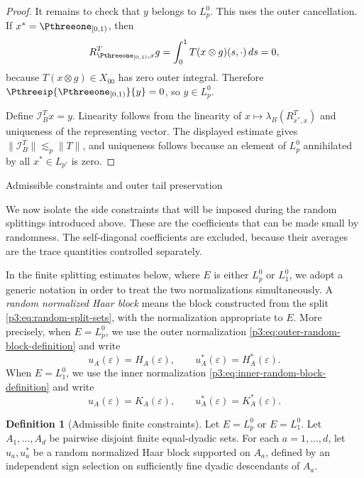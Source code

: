 \documentclass[11pt,reqno]{amsart}
\makeatletter
\theoremstyle{plain}
\theoremstyle{definition}
\newtheorem{definition}[definition]{Definition}
\newcounter{problempaper}
\newenvironment{problempaperbody}{%
  \setcounter{subsection}{0}%
  \setcounter{subsubsection}{0}%
  \setcounter{paragraph}{0}%
  \renewcommand{\thesubsection}{\arabic{subsection}}%
  \renewcommand{\thesubsubsection}{\thesubsection.\arabic{subsubsection}}%
  \renewcommand{\theparagraph}{\thesubsubsection.\arabic{paragraph}}%
  \let\problem@outersection\section
  \let\problem@outersubsection\subsection
  \let\problem@outersubsubsection\subsubsection
  \let\problem@outerparagraph\paragraph
  \let\section\problem@papersection
  \let\subsection\problem@papersubsection
  \let\subsubsection\problem@papersubsubsection
}{%
  \let\section\problem@outersection
  \let\subsection\problem@outersubsection
  \let\subsubsection\problem@outersubsubsection
  \let\paragraph\problem@outerparagraph
}
\newcommand{\problem@target}[2]{%
  \hypertarget{problem-\theproblempaper-#1-#2}{}%
}
\newcommand{\problem@paperheading}[3]{%
  \par\bigskip
  \problem@target{#1}{#2}%
  \noindent{\large\bfseries #2.\quad #3\par}%
  \nobreak\smallskip
}
\newcommand{\problem@papersubheading}[3]{%
  \par\medskip
  \problem@target{#1}{#2}%
  \noindent{\normalsize\bfseries #2.\quad #3\par}%
  \nobreak\smallskip
}
\newcommand{\problem@papersubsubheading}[3]{%
  \par\smallskip
  \problem@target{#1}{#2}%
  \noindent{\normalsize\itshape #2.\quad #3.\ }%
}
\def\problem@papersection{%
  \@ifstar{\problem@papersectionstar}{\problem@papersectionnostar}%
}
\def\problem@papersectionstar#1{%
  \par\bigskip\noindent{\large\bfseries #1\par}\nobreak\smallskip
}
\def\problem@papersectionnostar#1{%
  \refstepcounter{subsection}%
  \setcounter{subsubsection}{0}%
  \setcounter{paragraph}{0}%
  \problem@paperheading{section}{\thesubsection}{#1}%
  \problem@writecontentsline{section}{\thesubsection}{#1}%
}
\def\problem@papersubsection{%
  \@ifstar{\problem@papersubsectionstar}{\problem@papersubsectionnostar}%
}
\def\problem@papersubsectionstar#1{%
  \par\medskip\noindent{\normalsize\bfseries #1\par}\nobreak\smallskip
}
\def\problem@papersubsectionnostar#1{%
  \refstepcounter{subsubsection}%
  \setcounter{paragraph}{0}%
  \problem@papersubheading{subsection}{\thesubsubsection}{#1}%
  \problem@writecontentsline{subsection}{\thesubsubsection}{#1}%
}
\def\problem@papersubsubsection{%
  \@ifstar{\problem@papersubsubsectionstar}{\problem@papersubsubsectionnostar}%
}
\def\problem@papersubsubsectionstar#1{%
  \par\smallskip\noindent{\normalsize\itshape #1.\ }%
}
\def\problem@papersubsubsectionnostar#1{%
  \refstepcounter{paragraph}%
  \problem@papersubsubheading{subsubsection}{\theparagraph}{#1}%
  \problem@writecontentsline{subsubsection}{\theparagraph}{#1}%
}
\newcommand{\problem@writecontentsline}[3]{%
  \begingroup
  \protected@write\@auxout{}{%
    \string\problemcontentsentry{\theproblempaper}{#1}{#2}{#3}{\thepage}%
  }%
  \endgroup
}
\newcommand{\problemcontentsentry}[5]{%
  \@ifundefined{problemcontents@#1}{%
    \expandafter\gdef\csname problemcontents@#1\endcsname{}%
  }{}%
  \expandafter\g@addto@macro\csname problemcontents@#1\endcsname{%
    \problemcontentsline{#1}{#2}{#3}{#4}{#5}%
  }%
}
\newcommand{\problemcontentslink}[4]{%
  \hyperlink{problem-#1-#2-#3}{#4}%
}
\newcommand{\problemcontentsline}[5]{%
  \ifstrequal{#2}{section}{%
    \par\noindent
    \problemcontentslink{#1}{#2}{#3}{\makebox[2.5em][l]{#3}#4}%
    \nobreak\dotfill
    \problemcontentslink{#1}{#2}{#3}{#5}\par
  }{%
    \ifstrequal{#2}{subsection}{%
      \par\noindent\hspace*{1.5em}%
      \problemcontentslink{#1}{#2}{#3}{\makebox[3.5em][l]{#3}#4}%
      \nobreak\dotfill
      \problemcontentslink{#1}{#2}{#3}{#5}\par
    }{%
      \par\noindent\hspace*{3em}%
      \problemcontentslink{#1}{#2}{#3}{\makebox[4.5em][l]{#3}#4}%
      \nobreak\dotfill
      \problemcontentslink{#1}{#2}{#3}{#5}\par
    }%
  }%
}
\makeatother
\begin{document}
\begin{problempaperbody}
\begin{proof}
It remains to check that $y$ belongs to $L_p^0$. This uses the outer cancellation. If $x^*=\Pthreeone_{[0,1)}$, then
\begin{equation*}
        R_{\Pthreeone_{[0,1)},x}^Tg=\int_0^1T(x\otimes g)(s,\cdot)\,ds=0,
\end{equation*}
because $T(x\otimes g)\in X_{00}$ has zero outer integral. Therefore $\Pthreeip{\Pthreeone_{[0,1)}}{y}=0$, so $y\in L_p^0$.

Define $\mathcal I_B^Tx=y$. Linearity follows from the linearity of $x\mapsto\lambda_B(R_{x^*,x}^T)$ and uniqueness of the representing vector. The displayed estimate gives $\|\mathcal I_B^T\|\lesssim_p\|T\|$, and uniqueness follows because an element of $L_p^0$ annihilated by all $x^*\in L_{p'}$ is zero.
\end{proof}


\section{Admissible constraints and outer tail preservation}
\label{p3:sec:admissible-constraints-and-tail-preservation}

We now isolate the side constraints that will be imposed during the random splittings introduced above. These are the coefficients that can be made small by randomness. The self-diagonal coefficients are excluded, because their averages are the trace quantities controlled separately.

In the finite splitting estimates below, where $E$ is either $L_p^0$ or $L_1^0$, we adopt a generic notation in order to treat the two normalizations simultaneously. A \emph{random normalized Haar block} means the block constructed from the split \eqref{p3:eq:random-split-sets}, with the normalization appropriate to $E$. More precisely, when $E=L_p^0$, we use the outer normalization \eqref{p3:eq:outer-random-block-definition} and write
\begin{equation*}
        u_A(\varepsilon)=H_A(\varepsilon),\qquad u_A^*(\varepsilon)=H_A^*(\varepsilon).
\end{equation*}
When $E=L_1^0$, we use the inner normalization \eqref{p3:eq:inner-random-block-definition} and write
\begin{equation*}
        u_A(\varepsilon)=K_A(\varepsilon),\qquad u_A^*(\varepsilon)=K_A^*(\varepsilon).
\end{equation*}

\begin{definition}[Admissible finite constraints]
\label{p3:def:admissible-side-constraints}
Let $E=L_p^0$ or $E=L_1^0$. Let $A_1,\ldots,A_d$ be pairwise disjoint finite equal-dyadic sets. For each $a=1,\ldots,d$, let $u_a,u_a^*$ be a random normalized Haar block supported on $A_a$, defined by an independent sign selection on sufficiently fine dyadic descendants of $A_a$.


\end{definition}
\end{problempaperbody}
\end{document}
